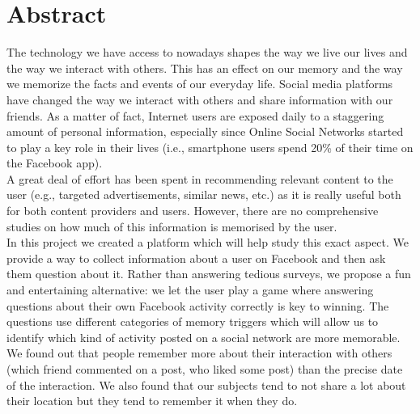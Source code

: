 

\cleardoublepage
\chapter*{Abstract}
The technology we have access to nowadays shapes the way we live our lives and the way we interact with others. This has an effect on our memory and the way we memorize the facts and events of our everyday life. Social media platforms have changed the way we interact with others and share information with our friends. As a matter of fact, Internet users are exposed daily to a staggering amount of personal information, especially since Online Social Networks started to play a key role in their lives (i.e., smartphone users spend 20\% of their time on the Facebook app).\\
A great deal of effort has been spent in recommending relevant content to the user (e.g., targeted advertisements, similar news, etc.) as it is really useful both for both content providers and users. However, there are no comprehensive studies on how much of this information is memorised by the user.\\
In this project we created a platform which will help study this exact aspect. We provide a way to collect information about a user on Facebook and then ask them question about it. Rather than answering tedious surveys, we propose a fun and entertaining alternative: we let the user play a game where answering questions about their own Facebook activity correctly is key to winning. The questions use different categories of memory triggers which will allow us to identify which kind of activity posted on a social network are more memorable.\\
We found out that people remember more about their interaction with others (which friend commented on a post, who liked some post) than the precise date of the interaction. We also found that our subjects tend to not share a lot about their location but they tend to remember it when they do.


